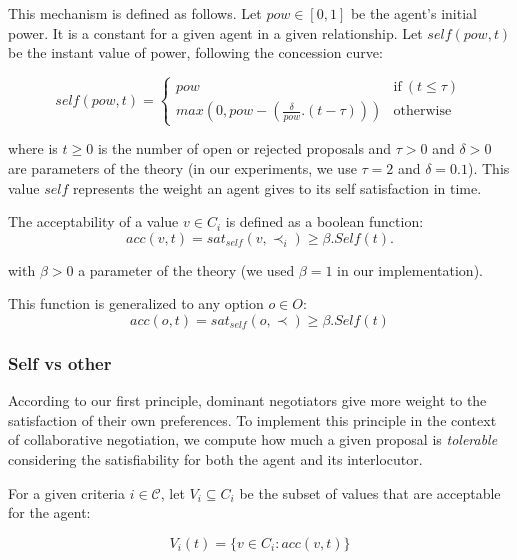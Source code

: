 \documentclass{llncs}
\begin{document}
	 This mechanism is defined as follows. Let $pow \in [0, 1] $ be the agent's initial power. It is a constant for a given agent in a given relationship. Let $self(pow, t)$ be the instant value of power, following the concession curve:
	 
	 \begin{equation}
	 self(pow, t) = \left\{\begin{array}{ll}
	 pow & \mathrm{if\ } (t \leq \tau)\\
	 max(0, pow - (\frac{\delta}{pow} . (t - \tau))) & \mathrm{otherwise}
	 \end{array}\right.
	 \end{equation}
	 
	 where is $t \geq 0$ is the number of open or rejected proposals and $\tau > 0$ and $\delta > 0$
	 are parameters of the theory (in our experiments, we use $\tau=2$ and $\delta=0.1$). This value $self$ represents the weight an agent gives to its self satisfaction in time.
	 
	 The acceptability of a value $v \in C_i$ is defined as a boolean function:
	 \begin{equation}
	 acc(v, t) = sat_{self}(v, \prec_i) \geq  \beta . Self(t).
	 \end{equation}
	 
	 with $\beta>0$ a parameter of the theory (we used $\beta=1$ in our implementation).
	 
	 This function is generalized to any option $o \in O$:
	 \begin{equation}
	 acc(o, t) = sat_{self}(o, \prec) \geq  \beta . Self(t)
	 \end{equation}
	
	\subsubsection {Self vs other}
	According to our first principle, dominant negotiators give more weight to the satisfaction of their own preferences. To implement this principle in the context of collaborative negotiation, we compute how much a given proposal is \emph{tolerable} considering the satisfiability for both the agent and its interlocutor.
	
	For a given criteria $i\in\mathcal{C}$, let $V_i\subseteq C_i$ be the subset of values that are acceptable for the agent:

	\begin{equation}
	V_i(t) = \{ v\in C_i : acc(v,t) \}
	\end{equation}
	
\end{document}
